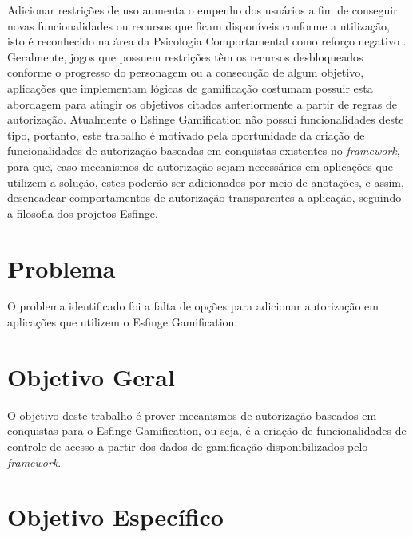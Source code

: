 \par Adicionar restrições de uso aumenta o empenho dos usuários a fim de conseguir novas funcionalidades ou recursos que ficam disponíveis conforme a utilização, isto é reconhecido na área da Psicologia Comportamental como reforço negativo  \cite{skinner1990behavior}. Geralmente, jogos que possuem restrições têm os recursos desbloqueados conforme o progresso do personagem ou a consecução de algum objetivo, aplicações que implementam lógicas de gamificação costumam possuir esta abordagem para atingir os objetivos citados anteriormente a partir de regras de autorização. Atualmente o Esfinge Gamification não possui funcionalidades deste tipo, portanto, este trabalho é motivado pela oportunidade da criação de funcionalidades de autorização baseadas em conquistas existentes no \textit{framework}, para que, caso mecanismos de autorização sejam necessários em aplicações que utilizem a solução, estes poderão ser adicionados por meio de anotações, e assim, desencadear comportamentos de autorização transparentes a aplicação, seguindo a filosofia dos projetos Esfinge.

\section{Problema}

\par O problema identificado foi a falta de opções para adicionar autorização em aplicações que utilizem o Esfinge Gamification.

\section{Objetivo Geral}
\par O objetivo deste trabalho é prover mecanismos de autorização baseados em conquistas para o Esfinge Gamification, ou seja, é a criação de funcionalidades de controle de acesso a partir dos dados de gamificação disponibilizados pelo \textit{framework}.

\section{Objetivo Espec\'ifico}

